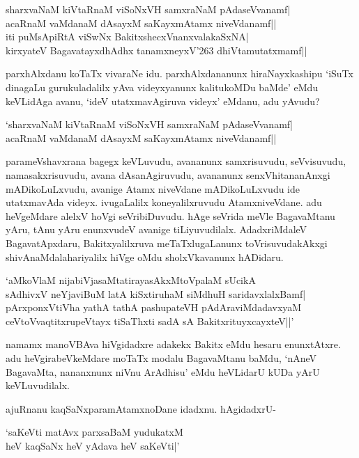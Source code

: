 \begin{shloka}
sharxvaNaM kiVtaRnaM viSoNxVH samxraNaM pAdaseVvanamf|\\
acaRnaM vaMdanaM dAsayxM saKayxmAtamx niveVdanamf||\\
iti puMsApiRtA viSwNx BakitxshecxVnanxvalakaSxNA|\\
kirxyateV BagavatayxdhAdhx tanamxneyxV\char'263 dhiVtamutatxmamf||
\end{shloka}

parxhAlxdanu koTaTx vivaraNe idu. parxhAlxdananunx hiraNayxkashipu `iSuTx dinagaLu gurukuladalilx yAva videyxyanunx kalitukoMDu 
baMde' eMdu keVLidAga avanu, `ideV utatxmavAgiruva videyx' eMdanu, adu yAvudu?

\begin{shloka}
`sharxvaNaM kiVtaRnaM viSoNxVH samxraNaM pAdaseVvanamf|\\
acaRnaM vaMdanaM dAsayxM saKayxmAtamx niveVdanamf||
\end{shloka}

parameVshavxrana bagegx keVLuvudu, avananunx samxrisuvudu, seVvisuvudu, namasakxrisuvudu, avana dAsanAgiruvudu, avananunx senxVhitananAnxgi mADikoLuLxvudu, avanige 
Atamx niveVdane mADikoLuLxvudu ide utatxmavAda videyx. ivugaLalilx koneyalilxruvudu AtamxniveVdane. adu heVgeMdare alelxV hoVgi seVribiDuvudu. 
hAge seVrida meVle BagavaMtanu yAru, tAnu yAru enunxvudeV avanige tiLiyuvudilalx. AdadxriMdaleV BagavatApxdaru, Bakitxyalilxruva meTaTxlugaLanunx 
toVrisuvudakAkxgi shivAnaMdalahariyalilx hiVge oMdu sholxVkavanunx hADidaru.

\begin{shloka}
`aMkoVlaM nijabiVjasaMtatirayasAkxMtoVpalaM sUcikA\\
sAdhivxV neYjaviBuM latA kiSxtiruhaM siMdhuH saridavxlalxBamf|\\
pArxponxVtiVha yathA tathA pashupateVH pAdAraviMdadavxyaM\\
ceVtoVvaqtitxrupeVtayx tiSaThxti sadA sA BakitxrituyxcayxteV||'
\end{shloka}

namamx manoVBAva hiVgidadxre adakekx Bakitx eMdu hesaru enunxtAtxre. adu heVgirabeVkeMdare moTaTx modalu BagavaMtanu baMdu, `nAneV BagavaMta, 
nananxnunx niVnu ArAdhisu' eMdu heVLidarU kUDa yArU keVLuvudilalx. 

ajuRnanu kaqSaNxparamAtamxnoDane idadxnu. hAgidadxrU-

\begin{shloka}
`saKeVti matAvx parxsaBaM yudukatxM\\
heV kaqSaNx heV yAdava heV saKeVti|'
\end{shloka}

